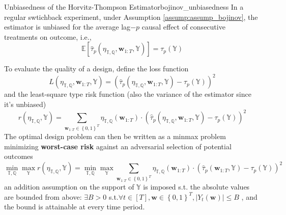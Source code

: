 \documentclass[twoside]{article}
\begin{document}
\begin{proposition}{Unbiasedness of the Horvitz-Thompson Estimator}{bojinov_unbiasedness}
    In a regular swtichback experiment, under Assumption \ref{assump:assump_bojinov}, the estimator is unbiased for the average lag$-p$ causal effect of consecutive treatments on outcome, i.e., $$\mathbb{E}\left[ \hat{\tau}_p\left(\eta_{\mathbb{T,Q}},\mathbf{w}_{1:T},\mathbb{Y}\right) \right] = \tau_p\left(\mathbb{Y}\right)$$
\end{proposition}

To evaluate the quality of a design, define the loss function 
$$ L \left(\eta_{\mathbb{T,Q}},\mathbf{w}_{1:T},\mathbb{Y}\right) = \left(\hat{\tau}_p \left(\eta_{\mathbb{T,Q}},\mathbf{w}_{1:T},\mathbb{Y}\right) - \tau_p (\mathbb{Y})\right)^2 $$
and the least-square type risk function (also the variance of the estimator since it's unbiased)
$$ r\left(\eta_{\mathbb{T,Q}},\mathbb{Y}\right) = \sum_{\mathbf{w}_{1:T}\in \left\{0,1\right\}^T} \eta_{\mathbb{T,Q}}(\mathbf{w}_{1:T})\cdot \left(\hat{\tau}_p\left(\eta_{\mathbb{T,Q}},\mathbf{w}_{1:T},\mathbb{Y}\right) - \tau_p(\mathbb{Y})\right)^2 $$
The optimal design problem can then be written as a minmax problem minimizing \textbf{worst-case risk} against an adversarial selection of potential outcomes 
\begin{equation*}
    \min_{\mathbb{T,Q}}\max_{\mathbb{Y}} r\left(\eta_{\mathbb{T,Q}},\mathbb{Y}\right) = \min_{\mathbb{T,Q}}\max_{\mathbb{Y}} \sum_{\mathbf{w}_{1:T}\in\left\{0,1\right\}^T} \eta_{\mathbb{T,Q}}(\mathbf{w}_{1:T})\cdot \left( \hat{\tau}_p\left(\mathbf{w}_{1:T},\mathbb{Y}\right) - \tau_p\left(\mathbb{Y}\right) \right)^2
\end{equation*}
an addition assumption on the support of $\mathbb{Y}$ is imposed s.t. the absolute values are bounded from above: $\exists B>0$ s.t.$\forall t \in [T], \mathbf{w}\in \left\{0,1\right\}^T, \left\vert Y_t\left(\mathbf{w}\right) \right\vert \leq B$ , and the bound is attainable at every time period.
\end{document}
